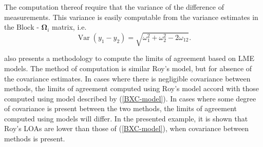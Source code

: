 \documentclass[12pt, a4paper]{report}
\theoremstyle{plain}
\theoremstyle{definition}
\theoremstyle{remark}
\begin{document}
	
	
	The computation thereof require that the variance of the difference of measurements. This variance is easily computable from the  variance estimates in the ${\mbox{Block - }\boldsymbol \Omega_{i}}$ matrix, i.e.
	\[
	\operatorname{Var}(y_1 - y_2) = \sqrt{ \omega^2_1 + \omega^2_2 - 2\omega_{12}}.
	\]
	
	\citet{BXC2008} also presents a methodology to compute the limits of agreement based on LME models. The method of computation is similar Roy's model, but for absence of the covariance estimates. In cases where there is negligible covariance between methods, the limits of agreement computed using Roy's model accord with those computed using model described by (\ref{BXC-model}). In cases where some degree of covariance is present between the two methods, the limits of agreement computed using models will differ. In the presented example, it is shown that Roy's LOAs are lower than those of (\ref{BXC-model}), when covariance between methods is present.
	
\end{document}
